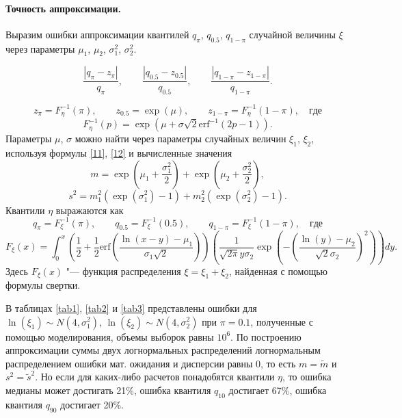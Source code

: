 \documentclass[12pt]{article}
\begin{document}
	\paragraph{Точность аппроксимации.}
	
	Выразим ошибки аппроксимации квантилей $q_{\pi}$, $q_{0.5}$, $q_{1-\pi}$ случайной величины $\xi$ через параметры $\mu_{1}$, $\mu_{2}$, $\sigma_{1}^{2}$, $\sigma_{2}^{2}$.
	
	\[\dfrac{\left| q_{\pi} - z_{\pi}\right|}{q_{\pi}}, \quad\quad \dfrac{\left| q_{0.5} - z_{0.5}\right|}{q_{0.5}}, \quad\quad \dfrac{\left| q_{1-\pi} - z_{1-\pi}\right|}{q_{1-\pi}}.\]
	
	\[z_{\pi} = F_{\eta}^{-1}(\pi), \quad\quad z_{0.5} = \exp(\mu), \quad\quad z_{1-\pi} = F_{\eta}^{-1}(1-\pi), \quad где\]
	\[F_{\eta}^{-1}(p) = \exp(\mu+\sigma\sqrt{2}\mathrm{erf}^{-1}(2p-1)).\]
	Параметры $\mu$, $\sigma$ можно найти через параметры случайных величин $\xi_{1}$, $\xi_{2}$, используя формулы \eqref{11}, \eqref{12} и вычисленные значения
	\[m = \exp\left( \mu_{1}+\frac{\sigma_{1}^{2}}{2}\right) + \exp\left( \mu_{2}+\frac{\sigma_{2} ^{2}}{2}\right),\]
	\[s^{2} = m_{1}^{2}(\exp(\sigma_{1}^{2})-1)+m_{2}^{2}(\exp(\sigma_{2}^{2})-1).\]
	Квантили $\eta$ выражаются как
	\[q_{\pi} = F_{\xi}^{-1}(\pi), \quad\quad q_{0.5} = F_{\xi}^{-1}(0.5), \quad\quad q_{1-\pi} = F_{\xi}^{-1}(1-\pi), \quad где\]
	\[F_{\xi}(x) = \int_{0}^{x}\left( \dfrac{1}{2}+\dfrac{1}{2} \mathrm{erf}\left( \dfrac{\ln(x-y)-\mu_{1}}{\sigma_{1}\sqrt{2}}\right) \right) \left( \dfrac{1}{\sqrt{2\pi}y\sigma_{2}}\exp\left( -\left( \dfrac{\ln(y)-\mu_{2}}{\sqrt{2}\sigma_{2}}\right) ^{2}\right) \right) dy. \]
	Здесь $F_{\xi}(x)$ "--- функция распределения $\xi = \xi_{1}+\xi_{2}$, найденная с помощью формулы свертки.
	
	В таблицах \ref{tab1}, \ref{tab2} и \ref{tab3} представлены ошибки для $\ln(\xi_{1}) \sim N(4, \sigma _{1}^{2})$, $\ln(\xi_{2}) \sim N(4, \sigma_{2}^{2})$ при $\pi=0.1$, полученные с помощью моделирования, объемы выборок равны $10^{6}$. По построению аппроксимации суммы двух логнормальных распределений логнормальным распределением ошибки мат. ожидания и дисперсии равны 0, то есть $m=\tilde{m}$ и $s^{2} = \tilde{s}^{2}$. Но если для каких-либо расчетов понадобятся квантили $\eta$, то ошибка медианы может достигать 21\%, ошибка  квантиля $q_{10}$ достигает 67\%, ошибка квантиля $q_{90}$ достигает 20\%.
	
	
\end{document}
